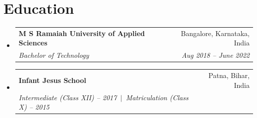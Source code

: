 \documentclass[a4paper,11pt]{article}
\makeatletter
\newcommand{\resumeQuadHeading}[4]{
  \item
  \begin{tabular*}{0.96\textwidth}[t]{l@{\extracolsep{\fill}}r}
    \textbf{#1} & #2 \\
    \textit{\small#3} & \textit{\small #4} \\
  \end{tabular*}
}
\newcommand{\resumeHeadingListStart}{
  \begin{itemize}[leftmargin=0.15in, label={}]
}
\newcommand{\resumeHeadingListEnd}{\end{itemize}}
\makeatother
\begin{document}
\section{Education}
  \resumeHeadingListStart{}
    \resumeQuadHeading{M S Ramaiah University of Applied Sciences}{Bangalore, Karnataka, India}
    {Bachelor of Technology}{Aug 2018 -- June 2022}
    \resumeQuadHeading{Infant Jesus School}{Patna, Bihar, India}
    {Intermediate (Class XII) -- 2017 \,$|$\, Matriculation (Class X) -- 2015}{}
  \resumeHeadingListEnd{}
\end{document}
